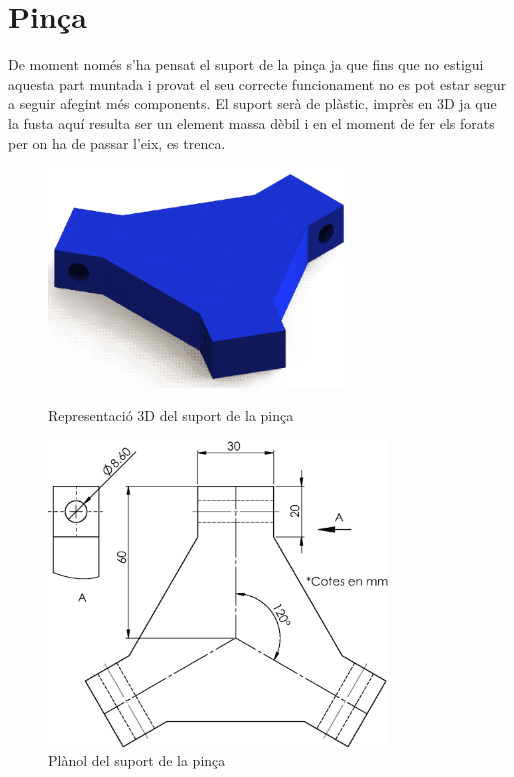 \documentclass[a4paper, 12pt]{article}
\begin{document}
\section{Pinça}
De moment només s'ha pensat el suport de la pinça ja que fins que no estigui aquesta part muntada i provat el seu correcte funcionament no es pot estar segur a seguir afegint més components. 
El suport serà de plàstic, imprès en 3D ja que la fusta aquí resulta ser un element massa dèbil i en el moment de fer els forats per on ha de passar l'eix, es trenca.
\begin{figure}[h!]
\centering
\begin{minipage}[b]{0.45\linewidth}
\centering
\includegraphics[width=8cm]{./imgComp/pinca}
\caption{Representació 3D del suport de la pinça}
\end{minipage}
\hfill
\begin{minipage}[b]{0.45\linewidth}
\centering
\includegraphics[width=9cm]{./sketch/pinca}
\caption{Plànol del suport de la pinça}
\end{minipage}
\end{figure}
\end{document}
